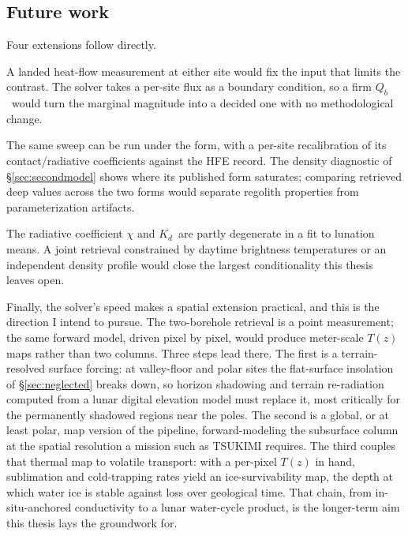 \documentclass[11pt,a4paper,oneside]{report}
\newcommand{\Kd}{\ensuremath{K_d}}
\newcommand{\Qb}{\ensuremath{Q_b}}
\begin{document}
\subsection{Future work}\label{sec:future}
Four extensions follow directly.

A landed heat-flow measurement at either site would fix the input
that limits the contrast. The solver takes a per-site flux as a
boundary condition, so a firm \Qb\ would turn the marginal magnitude
into a decided one with no methodological change.

The same sweep can be run under the \citet{martinez2021} form, with a
per-site recalibration of its contact/radiative coefficients against
the HFE record. The density diagnostic of \S\ref{sec:secondmodel}
shows where its published form saturates; comparing retrieved deep
values across the two forms would separate regolith properties from
parameterization artifacts.

The radiative coefficient $\chi$ and \Kd\ are partly degenerate in a
fit to lunation means. A joint retrieval constrained by daytime
brightness temperatures or an independent density profile would close
the largest conditionality this thesis leaves open.

Finally, the solver's speed makes a spatial extension practical, and
this is the direction I intend to pursue. The two-borehole retrieval
is a point measurement; the same forward model, driven pixel by
pixel, would produce meter-scale $T(z)$ maps rather than two columns.
Three steps lead there. The first is a terrain-resolved surface
forcing: at valley-floor and polar sites the flat-surface insolation
of \S\ref{sec:neglected} breaks down, so horizon shadowing and
terrain re-radiation computed from a lunar digital elevation model
must replace it, most critically for the permanently shadowed regions
near the poles. The second is a global, or at least polar, map version
of the pipeline, forward-modeling the subsurface column at the
spatial resolution a mission such as TSUKIMI requires. The third
couples that thermal map to volatile transport: with a per-pixel
$T(z)$ in hand, sublimation and cold-trapping rates yield an
ice-survivability map, the depth at which water ice is stable against
loss over geological time. That chain, from in-situ-anchored
conductivity to a lunar water-cycle product, is the longer-term aim
this thesis lays the groundwork for.

\appendix
\end{document}
